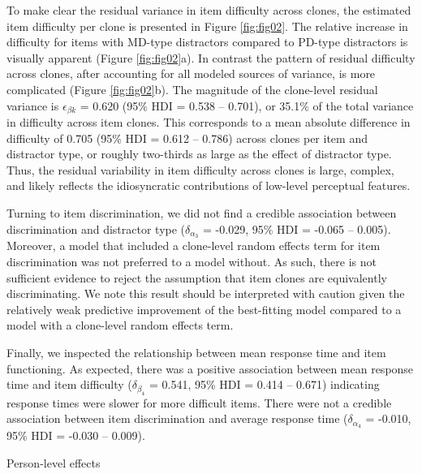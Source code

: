 \documentclass[a4paper,man,natbib]{apa6}
\makeatletter
\renewcommand{\subsubsection}{\@startsection{subsubsection}{3}
  {\z@}%
  {\b@level@two@skip}{\e@level@two@skip}%
  {\normalfont\normalsize\bfseries}}
\makeatother
\begin{document}
To make clear the residual variance in item difficulty across clones, the estimated item difficulty per clone is presented in Figure \ref{fig:fig02}. The relative increase in difficulty for items with MD-type distractors compared to PD-type distractors is visually apparent (Figure \ref{fig:fig02}a). In contrast the pattern of residual difficulty across clones, after accounting for all modeled sources of variance, is more complicated (Figure \ref{fig:fig02}b). The magnitude of the clone-level residual variance is $\epsilon_{\beta k}$ = 0.620 (95\% HDI = 0.538 -- 0.701), or 35.1\% of the total variance in difficulty across item clones. This corresponds to a mean absolute difference in difficulty of 0.705 (95\% HDI = 0.612 -- 0.786) across clones per item and distractor type, or roughly two-thirds as large as the effect of distractor type. Thus, the residual variability in item difficulty across clones is large, complex, and likely reflects the idiosyncratic contributions of low-level perceptual features. 

Turning to item discrimination, we did not find a credible association between discrimination and distractor type ($\delta_{\alpha_3}$ = -0.029, 95\% HDI = -0.065 -- 0.005). Moreover, a model that included a clone-level random effects term for item discrimination was not preferred to a model without. As such, there is not sufficient evidence to reject the assumption that item clones are equivalently discriminating. We note this result should be interpreted with caution given the relatively weak predictive improvement of the best-fitting model compared to a model with a clone-level random effects term.

Finally, we inspected the relationship between mean response time and item functioning. As expected, there was a positive association between mean response time and item difficulty ($\delta_{\beta_4}$ = 0.541, 95\% HDI = 0.414 -- 0.671) indicating response times were slower for more difficult items. There were not a credible association between item discrimination and average response time ($\delta_{\alpha_4}$ = -0.010, 95\% HDI = -0.030 -- 0.009).

\subsubsection{Person-level effects}
\end{document}

